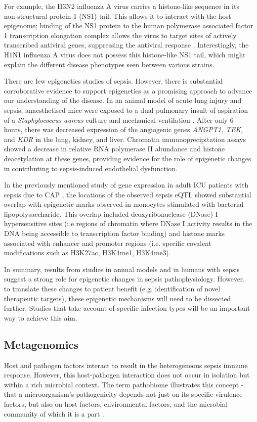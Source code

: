 For example, the H3N2 influenza A virus carries a histone-like sequence in its non-structural protein 1 (NS1) tail. This allows it to interact with the host epigenome;   binding of the NS1 protein to the human polymerase associated factor 1 transcription elongation complex allows the virus to target sites of actively transcribed antiviral genes, suppressing the antiviral response \parencite{Marazzi2012}. Interestingly, the H1N1 influenza A virus does not possess this histone-like NS1 tail, which might explain the different disease phenotypes seen between various strains.

There are few epigenetics studies of sepsis. However, there is substantial corroborative evidence to support epigenetics as a promising approach to advance our understanding of the disease. In an animal model of acute lung injury and sepsis, anaesthetised mice were exposed to a dual pulmonary insult of aspiration of a \textit{Staphylococcus aureus} culture and mechanical ventilation \parencite{Bomsztyk2015}. After only 6 hours, there was decreased expression of the angiogenic genes \textit{ANGPT1, TEK,} and \textit{KDR} in the lung, kidney, and liver. Chromatin immunoprecipitation assays showed a decrease in relative RNA polymerase II abundance and histone deacetylation at these genes, providing evidence for the role of epigenetic changes in contributing to sepsis-induced endothelial dysfunction.

In the previously mentioned study of gene expression in adult ICU patients with sepsis due to CAP \parencite{Davenport2016}, the locations of the observed sepsis eQTL showed substantial overlap with epigenetic marks observed in monocytes stimulated with bacterial lipopolysaccharide. This overlap included deoxyribonuclease (DNase) I hypersensitive sites (i.e regions of chromatin where DNase I activity results in the DNA being accessible to transcription factor binding) and histone marks associated with enhancer and promoter regions (i.e. specific covalent modifications such as H3K27ac, H3K4me1, H3K4me3).

In summary, results from studies in animal models and in humans with sepsis suggest a strong role for epigenetic changes in sepsis pathophysiology. However, to translate these changes to patient benefit (e.g. identification of novel therapeutic targets), these epigenetic mechanisms will need to be dissected further. Studies that take account of specific infection types will be an important way to achieve this aim.

\subsection{Metagenomics}
Host and pathogen factors interact to result in the heterogeneous sepsis immune response. However, this host-pathogen interaction does not occur in isolation but within a rich microbial context. The term pathobiome illustrates this concept - that a microorganism's pathogenicity depends not just on its specific virulence factors, but also on host factors, environmental factors, and the microbial community of which it is a part \parencite{Vayssier-Taussat2014}. 

